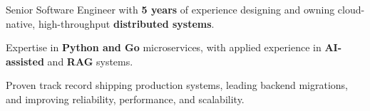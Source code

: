 \begin{zitemize}
    \item Senior Software Engineer with \textbf{5 years} of experience designing and owning cloud-native, high-throughput \textbf{distributed systems}.
    \item Expertise in \textbf{Python and Go} microservices, with applied experience in \textbf{AI-assisted} and \textbf{RAG} systems.
    \item Proven track record shipping production systems, leading backend migrations, and improving reliability, performance, and scalability.
\end{zitemize}

